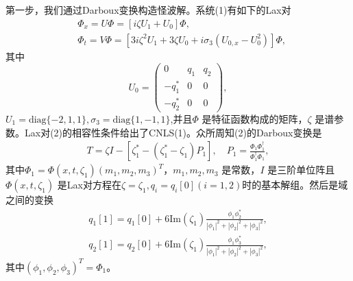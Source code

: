 \documentclass[11pt,a4paper]{ctexart}
\begin{document}
第一步，我们通过Darboux变换构造怪波解。系统(1)有如下的Lax对
\begin{align*}
	 & \Phi_{x} =U\Phi=[i\zeta U_{1} +U_{0} ]\Phi,\tag{2a}                                                \\
	 & \Phi_{t} =V\Phi=[3i\zeta^{2} U_{1} +3\zeta U_{0} +i\sigma_{3} (U_{0,x} -U_{0} ^{2} )]\Phi,\tag{2b}
\end{align*}
其中
$$
	U_{0} =\begin{pmatrix}
		0           & q_{1} & q_{2} \\
		-q_{1} ^{*} & 0     & 0     \\
		-q_{2} ^{*} & 0     & 0
	\end{pmatrix},
$$
$ U_{1}   =\text{diag}\{-2,1,1\}, \sigma_{3}=\text{diag}\{1,-1,1\}$,并且$ \Phi $ 是特征函数构成的矩阵，$ \zeta $ 是谱参数。Lax对(2)的相容性条件给出了CNLS(1)。众所周知(2)的Darboux变换是
\begin{align*}
	T=\zeta I-[\zeta_{1} ^{*} -(\zeta_{1} ^{*} -\zeta_{1} )P_{1} ],\quad P_{1} =\frac{\Phi_{1} \Phi_{1} ^{\dagger} }{\Phi_{1} ^{\dagger} \Phi_{1} },\tag{3}
\end{align*}
其中$ \Phi_{1} =\Phi(x,t,\zeta_{1} )(m_{1} ,m_{2},m_{3})^{T} $，$ m_{1} ,m_{2} ,m_{3}  $ 是常数，$ I $ 是三阶单位阵且$ \Phi(x,t,\zeta_{1} ) $ 是Lax对方程在$ \zeta=\zeta_{1} ,q_{i} =q_{i} [0](i=1,2) $时的基本解组。然后是域之间的变换
\begin{align*}
	q_{1} [1]=q_{1} [0]+6\text{Im}(\zeta_{1} )\frac{\phi_{1} \phi_{2} ^{*} }{|\phi_{1} |^{2} +|\phi_{2} |^{2} +|\phi_{3} |^{2} }, \\
	q_{2} [1]=q_{2} [0]+6\text{Im}(\zeta_{1} )\frac{\phi_{1} \phi_{3} ^{*} }{|\phi_{1} |^{2} +|\phi_{2} |^{2} +|\phi_{3} |^{2} },\tag{4}
\end{align*}
其中$ (\phi_{1} ,\phi_{2} ,\phi_{3} )^{T} =\Phi_{1} $。
\end{document}
